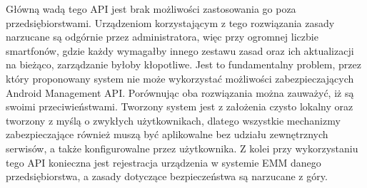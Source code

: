 Główną wadą tego API jest brak możliwości zastosowania go poza przedsiębiorstwami. Urządzeniom korzystającym z tego rozwiązania zasady narzucane są odgórnie przez administratora, więc przy ogromnej liczbie smartfonów, gdzie każdy wymagałby innego zestawu zasad oraz ich aktualizacji na bieżąco, zarządzanie byłoby kłopotliwe. Jest to fundamentalny problem, przez który proponowany system nie może wykorzystać możliwości zabezpieczających Android Management API.
\newline\newline
\indent Porównując oba rozwiązania można zauważyć, iż są swoimi przeciwieństwami. Tworzony system jest z założenia czysto lokalny oraz tworzony z myślą o zwykłych użytkownikach, dlatego wszystkie mechanizmy zabezpieczające również muszą być aplikowalne bez udziału zewnętrznych serwisów, a także konfigurowalne przez użytkownika. Z kolei przy wykorzystaniu tego API konieczna jest rejestracja urządzenia w systemie EMM danego przedsiębiorstwa, a zasady dotyczące bezpieczeństwa są narzucane z góry.



